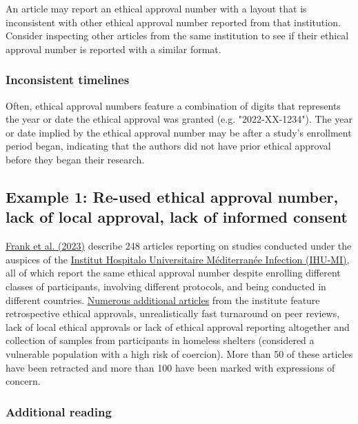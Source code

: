 \documentclass[letterpaper, 12pt]{article}
\begin{document}
An article may report an ethical approval number with a layout that is inconsistent with other ethical approval number reported from that institution. Consider inspecting other articles from the same institution to see if their ethical approval number is reported with a similar format.

\subsubsection*{Inconsistent timelines}

Often, ethical approval numbers feature a combination of digits that represents the year or date the ethical approval was granted (e.g. "2022-XX-1234"). The year or date implied by the ethical approval number may be after a study's enrollment period began, indicating that the authors did not have prior ethical approval before they began their research.

\subsection*{Example 1: Re-used ethical approval number, lack of local approval, lack of informed consent}

\href{https://doi.org/10.1186/s41073-023-00134-4}{Frank et al. (2023)} describe 248 articles reporting on studies conducted under the auspices of the \href{https://www.mediterranee-infection.com/}{Institut Hospitalo Universitaire Méditerranée Infection (IHU-MI)}, all of which report the same ethical approval number despite enrolling different classes of participants, involving different protocols, and being conducted in different countries. \href{https://ihu-correction.com/}{Numerous additional articles} from the institute feature retrospective ethical approvals, unrealistically fast turnaround on peer reviews, lack of local ethical approvals or lack of ethical approval reporting altogether and collection of samples from participants in homeless shelters (considered a vulnerable population with a high risk of coercion). More than 50 of these articles have been retracted and more than 100 have been marked with expressions of concern.

\subsubsection*{Additional reading}
\end{document}
